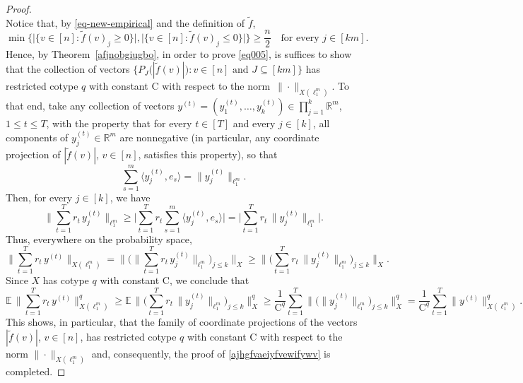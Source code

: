 \documentclass[11pt,leqno]{amsart}
\theoremstyle{remark}
\theoremstyle{plain}
\newcommand{\R}{\mathbb{R}}
\newcommand{\Exp}{\mathbb{E}}
\begin{document}
\begin{proof}
\begin{equation}
\end{equation}
Notice that, by \eqref{eq-new-empirical} and the definition of $\tilde f$,
$$ \min\Big\{\big|\{v\in [n]\colon \tilde f(v)_j\geqslant 0\}\big|,
\big|\{v\in [n]\colon \tilde f(v)_j\leqslant 0\}\big|\Big\}\geqslant
\frac{n}{2} \ \ \ \text{ for every } j\in [km]. $$
Hence, by Theorem~\ref{afjnobgiugbo}, in order to prove \eqref{eq005}, is suffices to show that
the collection of vectors $\big\{P_J\big(|\tilde f(v)|\big)\colon v\in[n] \text{ and } J\subseteq [km]\big\}$
has restricted cotype $q$ with constant $\mathrm{C}$ with respect to the norm~$\|\cdot\|_{X(\ell_1^m)}$.
To that end, take any collection of vectors $y^{(t)}=(y_1^{(t)},\dots,y_k^{(t)})\in\prod_{j=1}^k \R^{m}$,
$1\leqslant t\leqslant T$, with the property that for every $t\in [T]$ and every $j\in [k]$,
all components of $y_j^{(t)}\in\R^m$ are nonnegative (in particular, any coordinate projection of
$|\tilde f(v)|$, $v\in[n]$, satisfies this property), so that
$$ \sum_{s=1}^m\langle y_j^{(t)},e_s\rangle =\|y_j^{(t)}\|_{\ell_1^m}. $$
Then, for every $j\in [k]$, we have
$$ \Big\|\sum_{t=1}^T r_t\, y_j^{(t)}\Big\|_{\ell_1^m}
\geqslant \Big| \sum_{t=1}^T r_t \sum_{s=1}^m\langle y_j^{(t)},e_s\rangle \Big|
=\Big|\sum_{t=1}^T r_t\, \|y_j^{(t)}\|_{\ell_1^m} \Big|. $$
Thus, everywhere on the probability space,
$$ \Big\|\sum_{t=1}^T r_t\, y^{(t)} \Big\|_{X(\ell_1^m)}
=\Big\|\Big(\Big\|\sum_{t=1}^T r_t\, y_j^{(t)}\Big\|_{\ell_1^m}\Big)_{j\leqslant k}
\Big\|_{X} \geqslant \Big\|\Big(\sum_{t=1}^T r_t\, \|y_j^{(t)}\|_{\ell_1^m}\Big)_{j\leqslant k} \Big\|_{X}. $$
Since $X$ has cotype $q$ with constant $\mathrm{C}$, we conclude that
$$ \Exp\,\Big\|\sum_{t=1}^T r_t\, y^{(t)} \Big\|_{X(\ell_1^m)}^q \!
\geqslant \Exp\,\Big\|\Big(\sum_{t=1}^T r_t\, \|y_j^{(t)}\|_{\ell_1^m}\Big)_{j\leqslant k} \Big\|_{X}^q
\geqslant \frac{1}{\mathrm{C}^q} \sum_{t=1}^T \big\|\big( \|y_j^{(t)}\|_{\ell_1^m}\big)_{j\leqslant k}\big\|_X^q
=\frac{1}{\mathrm{C}^q} \sum_{t=1}^T \big\|y^{(t)}\big\|_{X(\ell_1^m)}^q. $$
This shows, in particular, that the family of coordinate projections of the vectors $|\tilde f(v)|$, $v\in[n]$,
has restricted cotype $q$ with constant $\mathrm{C}$ with respect to the norm $\|\cdot\|_{X(\ell_1^m)}$
and, consequently, the proof of \eqref{ajhgfvaeiyfvewifywv} is completed.


\end{proof}
\end{document}
